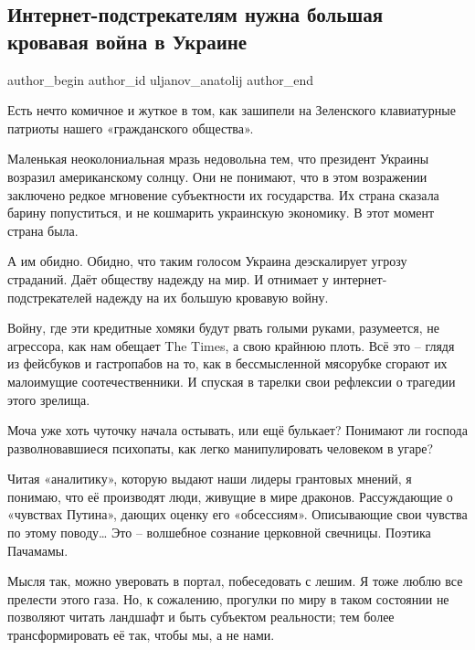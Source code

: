  
 
 
 
 
 
\subsection{Интернет-подстрекателям нужна большая кровавая война в Украине}
\label{sec:31_01_2022.fb.uljanov_anatolij.1.internet_podsrekateli}
 
\ifcmt
 author_begin
   author_id uljanov_anatolij
 author_end
\fi

Есть нечто комичное и жуткое в том, как зашипели на Зеленского клавиатурные
патриоты нашего «гражданского общества». 


Маленькая неоколониальная мразь недовольна тем, что президент Украины возразил
американскому солнцу. Они не понимают, что в этом возражении заключено редкое
мгновение субъектности их государства. Их страна сказала барину попуститься, и
не кошмарить украинскую экономику. В этот момент страна была. 

А им обидно. Обидно, что таким голосом Украина деэскалирует угрозу страданий.
Даёт обществу надежду на мир. И отнимает у интернет-подстрекателей надежду на
их большую кровавую войну. 

Войну, где эти кредитные хомяки будут рвать голыми руками, разумеется, не
агрессора, как нам обещает The Times, а свою крайнюю плоть. Всё это – глядя из
фейсбуков и гастропабов на то, как в бессмысленной мясорубке сгорают их
малоимущие соотечественники. И спуская в тарелки свои рефлексии о трагедии
этого зрелища.

Моча уже хоть чуточку начала остывать, или ещё булькает? Понимают ли господа
разволновавшиеся психопаты, как легко манипулировать человеком в угаре? 

Читая «аналитику», которую выдают наши лидеры грантовых мнений, я понимаю, что
её производят люди, живущие в мире драконов. Рассуждающие о «чувствах Путина»,
дающих оценку его «обсессиям». Описывающие свои чувства по этому поводу… Это –
волшебное сознание церковной свечницы. Поэтика Пачамамы.

Мысля так, можно уверовать в портал, побеседовать с лешим. Я тоже люблю все
прелести этого газа. Но, к сожалению, прогулки по миру в таком состоянии не
позволяют читать ландшафт и быть субъектом реальности; тем более
трансформировать её так, чтобы мы, а не нами.

